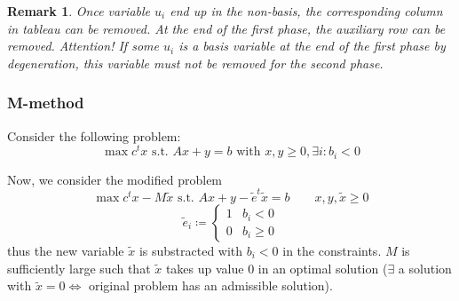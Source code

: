 \documentclass[a4paper]{article}
\numberwithin{lecref}{subsection}
\newtheorem*{Remark}{Remark}
\begin{document}
\begin{Remark}
	Once variable $u_i$ end up in the non-basis, the corresponding column in tableau can be removed. At the end of the first phase, the auxiliary row can be removed. Attention! If some $u_i$ is a basis variable at the end of the first phase by degeneration, this variable must not be removed for the second phase.
\end{Remark}

\subsubsection{M-method}

Consider the following problem:
\[ \max{c^t x} \text{ s.t. } Ax + y = b \text{ with } x, y \geq 0, \exists i: b_i < 0 \]

Now, we consider the modified problem
\[ \max{c^tx - M\tilde x} \text{ s.t. } Ax + y - \tilde e^t \tilde x = b \qquad x, y, \tilde x \geq 0 \]
\[ \tilde e_i \coloneqq \begin{cases} 1 & b_i < 0 \\ 0 & b_i \geq 0 \end{cases} \]
thus the new variable $\tilde x$ is substracted with $b_i < 0$ in the constraints.
$M$ is sufficiently large such that $\tilde x$ takes up value 0 in an optimal solution ($\exists$ a solution with $\tilde x = 0 \iff$ original problem has an admissible solution).
\end{document}
